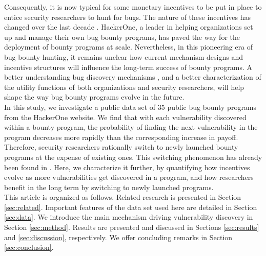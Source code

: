 Consequently, it is now typical for some monetary incentives to be put in place to entice security researchers to hunt for bugs. The nature of these incentives has changed over the last decade \cite{bohme2006comparison,finifter2013empirical,zhao2014exploratory,zhao2015empirical}. HackerOne, a leader in helping organizations set up and manage their own bug bounty programs, has paved the way for the deployment of bounty programs at scale. Nevertheless, in this pioneering era of bug bounty hunting, it remains unclear how current mechanism designs and incentive structures will influence the long-term success of bounty programs. A better understanding bug discovery mechanisms \cite{zhao2016empirical}, and a better characterization of the utility functions of both organizations and security researchers, will help shape the way bug bounty programs evolve in the  future.\\

In this study, we investigate a public data set of 35 public bug bounty programs from the HackerOne website. We find that with each vulnerability discovered within a bounty program, the probability of finding the next vulnerability in the program decreases more rapidly than the corresponding increase in payoff. Therefore, security researchers rationally switch to newly launched bounty programs at the expense of existing ones. This switching phenomenon has already been found in \cite{zhao2015empirical}. Here, we characterize it further, by quantifying how incentives evolve as more vulnerabilities get discovered in a program, and how researchers benefit in the long term by switching to newly launched programs.\\

This article is organized as follows. Related research is presented in Section \ref{sec:related}. Important features of the data set used here are detailed in Section \ref{sec:data}. We introduce the main mechanism driving vulnerability discovery in Section \ref{sec:method}. Results are presented and discussed in Sections \ref{sec:results} and \ref{sec:discussion}, respectively. We offer concluding remarks in Section \ref{sec:conclusion}.

